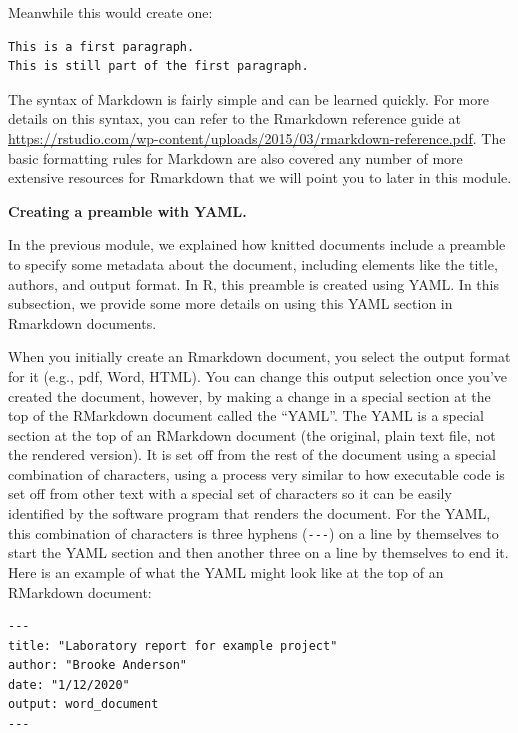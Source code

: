 \documentclass[]{tufte-book}
\begin{document}
Meanwhile this would create one:

\begin{verbatim}
This is a first paragraph.
This is still part of the first paragraph.
\end{verbatim}

The syntax of Markdown is fairly simple and can be learned quickly. For more
details on this syntax, you can refer to the Rmarkdown reference guide at
\url{https://rstudio.com/wp-content/uploads/2015/03/rmarkdown-reference.pdf}. The
basic formatting rules for Markdown are also covered any number of more
extensive resources for Rmarkdown that we will point you to later in this
module.

\textbf{Creating a preamble with YAML.}

In the previous module, we explained how knitted documents include a
preamble to specify some metadata about the document, including elements
like the title, authors, and output format. In R, this preamble is
created using YAML. In this subsection, we provide some more details
on using this YAML section in Rmarkdown documents.

When you initially create an Rmarkdown document, you select the output format
for it (e.g., pdf, Word, HTML). You can change this output selection once you've
created the document, however, by making a change in a special section at the
top of the RMarkdown document called the ``YAML''. The YAML is a special section
at the top of an RMarkdown document (the original, plain text file, not the
rendered version). It is set off from the rest of the document using a special
combination of characters, using a process very similar to how executable code
is set off from other text with a special set of characters so it can be easily
identified by the software program that renders the document. For the YAML, this
combination of characters is three hyphens (\texttt{-\/-\/-}) on a line by themselves to
start the YAML section and then another three on a line by themselves to end it.
Here is an example of what the YAML might look like at the top of an RMarkdown
document:

\begin{verbatim}
---
title: "Laboratory report for example project"
author: "Brooke Anderson"
date: "1/12/2020"
output: word_document
---
\end{verbatim}
\end{document}

